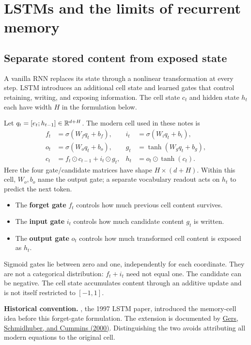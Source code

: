 \clearpage
\section{LSTMs and the limits of recurrent memory}\label{sec:lstm}
\subsection*{Separate stored content from exposed state}
A vanilla RNN replaces its state through a nonlinear transformation at
every step. LSTM introduces an additional cell state and learned gates
that control retaining, writing, and exposing information. The cell state
$c_t$ and hidden state $h_t$ each have width $H$ in the formulation below.

Let $q_t=[e_t;h_{t-1}]\in\mathbb{R}^{d+H}$. The modern cell used in these notes is
\begin{align*}
 f_t&=\sigma(W_fq_t+b_f), & i_t&=\sigma(W_iq_t+b_i),\\
 o_t&=\sigma(W_oq_t+b_o), & g_t&=\tanh(W_gq_t+b_g),\\
 c_t&=f_t\odot c_{t-1}+i_t\odot g_t,
 &h_t&=o_t\odot\tanh(c_t).
\end{align*}
Here the four gate/candidate matrices have shape $H\times(d+H)$.
Within this cell, $W_o,b_o$ name the output gate; a separate vocabulary
readout acts on $h_t$ to predict the next token.


\begin{itemize}
\item The \textbf{forget gate} $f_t$ controls how much previous cell content survives.
\item The \textbf{input gate} $i_t$ controls how much candidate content $g_t$ is written.
\item The \textbf{output gate} $o_t$ controls how much transformed cell content is exposed as $h_t$.
\end{itemize}
Sigmoid gates lie between zero and one, independently for each coordinate.
They are not a categorical distribution: $f_t+i_t$ need not equal one.
The candidate can be negative. The cell state accumulates content through
an additive update and is not itself restricted to $[-1,1]$.

\textbf{Historical convention.} , the 1997 LSTM paper,
introduced the memory-cell idea before this forget-gate formulation.
The extension is documented by \href{https://sferics.idsia.ch/pub/juergen/FgGates-NC.pdf}{Gers,
Schmidhuber, and Cummins (2000)}. Distinguishing the two avoids attributing
all modern equations to the original cell.

